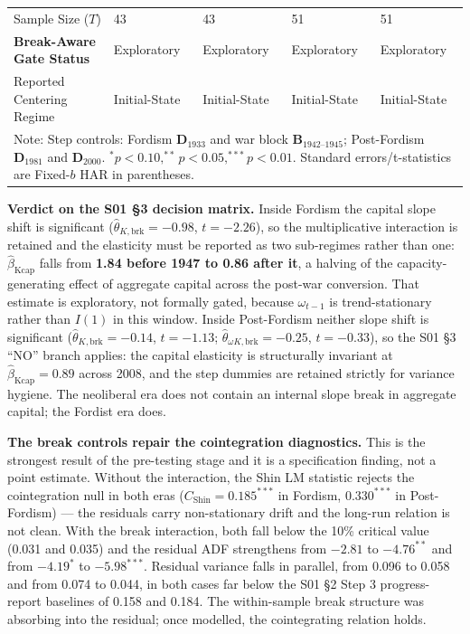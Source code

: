 \documentclass[11pt,a4paper]{article}
\begin{document}
\begin{table}[h!]
\begin{tabular}{p{5.5cm}p{2.5cm}p{2.5cm}p{2.5cm}p{2.5cm}}
Sample Size ($T$) & 43 & 43 & 51 & 51 \\
\textbf{Break-Aware Gate Status} & Exploratory & Exploratory & Exploratory & Exploratory \\
Reported Centering Regime & Initial-State & Initial-State & Initial-State & Initial-State \\
\bottomrule
\multicolumn{5}{p{15.5cm}}{\footnotesize Note: Step controls: Fordism $\mathbf{D}_{1933}$ and war block $\mathbf{B}_{1942\text{--}1945}$; Post-Fordism $\mathbf{D}_{1981}$ and $\mathbf{D}_{2000}$. $^{*}p<0.10, ^{**}p<0.05, ^{***}p<0.01$. Standard errors/t-statistics are Fixed-$b$ HAR in parentheses.}
\end{tabular}
\end{table}

\textbf{Verdict on the S01 \S3 decision matrix.} Inside Fordism the capital slope shift is significant ($\hat{\theta}_{K, \text{brk}} = -0.98$, $t = -2.26$), so the multiplicative interaction is retained and the elasticity must be reported as two sub-regimes rather than one: $\hat{\beta}_{\text{Kcap}}$ falls from \textbf{1.84 before 1947 to 0.86 after it}, a halving of the capacity-generating effect of aggregate capital across the post-war conversion. That estimate is exploratory, not formally gated, because $\omega_{t-1}$ is trend-stationary rather than $I(1)$ in this window. Inside Post-Fordism neither slope shift is significant ($\hat{\theta}_{K, \text{brk}} = -0.14$, $t = -1.13$; $\hat{\theta}_{\omega K, \text{brk}} = -0.25$, $t = -0.33$), so the S01 \S3 ``NO'' branch applies: the capital elasticity is structurally invariant at $\hat{\beta}_{\text{Kcap}} = 0.89$ across 2008, and the step dummies are retained strictly for variance hygiene. The neoliberal era does not contain an internal slope break in aggregate capital; the Fordist era does.

\textbf{The break controls repair the cointegration diagnostics.} This is the strongest result of the pre-testing stage and it is a specification finding, not a point estimate. Without the interaction, the Shin LM statistic rejects the cointegration null in both eras ($C_{\text{Shin}} = 0.185^{***}$ in Fordism, $0.330^{***}$ in Post-Fordism) --- the residuals carry non-stationary drift and the long-run relation is not clean. With the break interaction, both fall below the 10\% critical value (0.031 and 0.035) and the residual ADF strengthens from $-2.81$ to $-4.76^{**}$ and from $-4.19^{*}$ to $-5.98^{***}$. Residual variance falls in parallel, from 0.096 to 0.058 and from 0.074 to 0.044, in both cases far below the S01 \S2 Step 3 progress-report baselines of 0.158 and 0.184. The within-sample break structure was absorbing into the residual; once modelled, the cointegrating relation holds.
\end{document}
